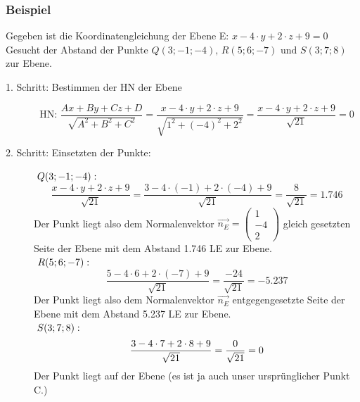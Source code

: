 \subsubsection{Beispiel}
Gegeben ist die Koordinatengleichung der Ebene E: \(x - 4 \cdot y + 2 \cdot z + 9 = 0 \)\\
Gesucht der Abstand der Punkte \(Q(3; -1; -4)\text{, }R(5; 6; -7) \text{ und } S(3; 7; 8)\) zur Ebene.
\begin{description} 
    \item[1. Schritt: Bestimmen der HN der Ebene]
    \begin{displaymath}
    \text{HN: } \frac{Ax + By + Cz + D}{\sqrt{A^{2} + B^{2} + C^{2}}} = \frac{x - 4\cdot y + 2 \cdot z + 9}{\sqrt{1^{2} + (-4)^{2} + 2^{2}}} = \frac{x - 4 \cdot y + 2 \cdot z + 9}{\sqrt{21}} = 0
    \end{displaymath}
    \item[2. Schritt: Einsetzten der Punkte:]
    \(\text{ }\\ Q(3; -1; -4): \)
    \begin{displaymath}
   \frac{x - 4 \cdot y + 2 \cdot z + 9}{\sqrt{21}} = \frac{3 - 4 \cdot (-1) + 2 \cdot (-4) + 9}{\sqrt{21}} = \frac{8}{\sqrt{21}} = 1.746
   \end{displaymath}
   Der Punkt liegt also dem Normalenvektor \( \vec{n_{E}} = \begin{pmatrix} 1 \\ -4 \\ 2 \end{pmatrix} \) gleich gesetzten Seite der Ebene mit dem Abstand 1.746 LE zur Ebene.\\
    \(\text{ }\\R(5; 6; -7):\\ \)
    \begin{displaymath}
    \frac{5 - 4 \cdot 6 + 2 \cdot (-7) + 9}{\sqrt{21}} = \frac{-24}{\sqrt{21}} = -5.237
    \end{displaymath}
    Der Punkt liegt also dem Normalenvektor \( \vec{n_{E}} \) entgegengesetzte Seite der Ebene mit dem Abstand 5.237 LE zur Ebene.\\
    \(\text{ }\\S(3; 7; 8): \\ \)
    \begin{displaymath}
    \frac{3 - 4 \cdot 7 + 2 \cdot 8 + 9}{\sqrt{21}} = \frac{0}{\sqrt{21}} = 0\\
   \end{displaymath}
   Der Punkt liegt auf der Ebene (es ist ja auch unser ursprünglicher Punkt C.)
\end{description}


